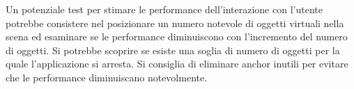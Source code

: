 \documentclass[crop=false, class=book]{standalone}
\begin{document}
	\begin{flushleft}
		Un potenziale test per stimare le performance dell'interazione con l'utente potrebbe consistere nel posizionare un 				numero notevole di oggetti virtuali nella scena ed 	esaminare se le performance diminuiscono con 								l'incremento del numero di oggetti.  Si potrebbe scoprire se esiste una soglia di numero di oggetti  per la 					quale l'applicazione si arresta. Si consiglia di eliminare anchor inutili per evitare che le performance 						diminuiscano notevolmente.
	\end{flushleft}
			
	
\end{document}
